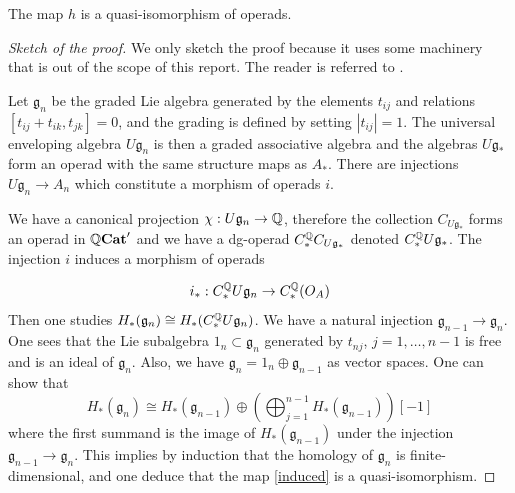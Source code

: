 \documentclass[TFM.tex]{subfiles}
\begin{document}
\begin{prop}\label{4.1}
The map $h$ is a quasi-isomorphism of operads. 
\end{prop}
\begin{proof}[Sketch of the proof] We only sketch the proof because it uses some machinery that is out of the scope of this report. The reader is referred to \cite{Tamarkin}.

Let $\mathfrak{g}_n$ be the graded Lie algebra generated by the elements $t_{ij}$ and
relations $[t_{ij}+t_{ik},t_{jk}]=0$, and the grading is defined by setting $|t_{ij}|= 1$. The universal enveloping algebra $U\mathfrak{g}_n$ is then a graded associative algebra and the algebras $U\mathfrak{g}_*$ form an operad with the same structure maps as $A_*$. There are injections $U\mathfrak{g}_n\to A_n$ which constitute a morphism of operads $i$.

We have a canonical projection $\chi:U\mathfrak{g}_n\to\mathbb{Q}$, therefore the collection $C_{U\mathfrak{g}_*}$ forms an operad in $\mathbb{Q}\mathrm{\mathbf{Cat}}'$ and we have a dg-operad $C_*^{\mathbb{Q}} C_{U\mathfrak{g}_*}$ denoted $C_*^{\mathbb{Q}} U\mathfrak{g}_*$. The injection $i$ induces a morphism of operads 

\begin{equation}\label{induced}
i_*:C_*^{\mathbb{Q}} U\mathfrak{g}_n\to C_*^{\mathbb{Q}}(O_A)
\end{equation}
Then one studies $H_*(\mathfrak{g}_n)\cong H_*(C_*^{\mathbb{Q}} U\mathfrak{g}_n)$. We have a natural injection $\mathfrak{g}_{n-1}\to \mathfrak{g}_n$. One sees that the Lie subalgebra $\mathfrak{1}_n\subset \mathfrak{g}_n$ generated by $t_{nj}$, $j=1,\dots, n-1$ is free and is an ideal of $\mathfrak{g}_n$. Also, we have $\mathfrak{g}_n=\mathfrak{1}_n\oplus\mathfrak{g}_{n-1}$ as vector spaces. One can show that
\begin{equation}\label{homology}
H_*(\mathfrak{g}_n)\cong H_*(\mathfrak{g}_{n-1})\oplus \left(\bigoplus_{j=1}^{n-1}H_*(\mathfrak{g}_{n-1})\right)[-1]
\end{equation}
where the first summand is the image of $H_*(\mathfrak{g}_{n-1})$ under the injection $\mathfrak{g}_{n-1}\to \mathfrak{g}_n$. This implies by induction that the homology of $\mathfrak{g}_n$ is finite-dimensional, and one deduce that
the map \ref{induced} is a quasi-isomorphism. 


\end{proof}
\end{document}
